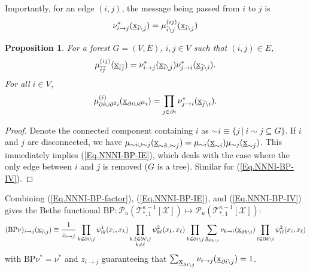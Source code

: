\documentclass[12pt]{article}
\newtheorem{proposition}[theorem]{Proposition}
\newcommand{\tree}[2]{\mathcal{T}_{*, #1}^{#2}[\mathcal{X}]}
\newcommand{\BS}{\backslash}
\newcommand{\UBX}{\underbar{\textbf{\normalfont x}}}
\newcommand{\BI}{\bar{i}}
\newcommand{\BJ}{\bar{j}}
\newcommand{\PI}{\partial i}
\newcommand{\PIN}{\partial^2 i}
\newcommand{\BIJ}{\overline{ij}}
\newcommand{\RA}{\rightarrow}
\numberwithin{equation}{section}
\begin{document}
Importantly, for an edge $(i, j)$, the message being passed from $i$ to $j$ is
\begin{equation}\label{Eq.NNNI-BP-MSG}
    \nu^*_{i\RA j}(\UBX_{\BI\BS j}) = \mu^{(ij)}_{\BI\BS j}(\UBX_{\BI\BS j})
\end{equation}

\begin{proposition}
    For a forest $G = (V, E)$, $i, j \in V$ such that $(i, j)\in E$,
    \begin{equation}\label{Eq.NNNI-BP-IE}
        \mu^{(ij)}_{\BIJ}(\UBX_{\BIJ})              = \nu^*_{i\RA j}(\UBX_{\BI\BS j})\nu^*_{j\RA i}(\UBX_{\BJ\BS i}).
    \end{equation}
    For all $i\in V$,
    \begin{equation}\label{Eq.NNNI-BP-IV}
        \mu^{(i)}_{\PI\cup\PIN}(\UBX_{\PI\cup\PIN}) = \prod_{j\in\PI}\nu^*_{j\RA i}(\UBX_{\BJ\BS i}).
    \end{equation}
\end{proposition}

\begin{proof}
    Denote the connected component containing $i$ as $\sim i \equiv \{j\ |\ i\sim j\subseteq G\}$. If $i$ and $j$ are disconnected, we have
    $\mu_{\sim i\cup \sim j}(\UBX_{\sim i\cup \sim j}) = \mu_{\sim i}(\UBX_{\sim i})\mu_{\sim j}(\UBX_{\sim j})$. This immediately implies (\ref{Eq.NNNI-BP-IE}), which deals with the case where the only edge between $i$ and $j$ is removed ($G$ is a tree). Similar for (\ref{Eq.NNNI-BP-IV}).
\end{proof}

Combining (\ref{Eq.NNNI-BP-factor}), (\ref{Eq.NNNI-BP-IE}), and (\ref{Eq.NNNI-BP-IV}) gives the Bethe functional $\text{BP}: \mathcal{P}_u(\tree{1}{\kappa-1})\mapsto \mathcal{P}_u(\tree{1}{\kappa-1})$:
\begin{equation}
    (\text{BP}\nu)_{i\RA j}(\UBX_{\BI\BS j}) \equiv \frac{1}{z_{i\RA j}} \prod_{k\in\PI\BS j} \psi^1_{ik}(x_i, x_k) \prod_{\substack{k, \ell\in\PI\BS j \\ k\neq \ell}} \psi^2_{k\ell}(x_k, x_\ell) \prod_{k\in\PI\BS j}\sum_{\UBX_{\partial k\BS i}}\nu_{k\RA i}(\UBX_{\partial k\BS i})\prod_{\ell\in\partial k\BS i} \psi^2_{i\ell}(x_i, x_\ell)
\end{equation}
with $\text{BP}\nu^* = \nu^*$ and $z_{i\RA j}$ guaranteeing that $\sum_{\UBX_{\PI\BS j}}\nu_{i\RA j}(\UBX_{\PI\BS j}) = 1$.
\end{document}
